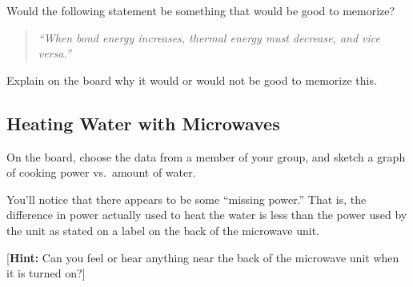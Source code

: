 \noindent Would the following statement be something that would be good to memorize?

\begin{quote}
	{\em ``When bond energy increases, thermal energy must decrease, and vice versa.''}
\end{quote}

\noindent Explain on the board why it would or would not be good to memorize this.

\WCD  

\subsection{Heating Water with Microwaves}

\begin{fnt}
	
\end{fnt}


\noindent On the board, choose the data from a member of your group, and sketch a graph of cooking power vs.\ amount of water. 

You'll notice that there appears to be some ``missing power.'' That is, the difference in power actually used to heat the water is less than the power used by the unit as stated on a label on the back of the microwave unit.

{[}\textbf{Hint:} Can you feel or hear anything near the back of the microwave unit when it is turned on?{]}

\WCD  
